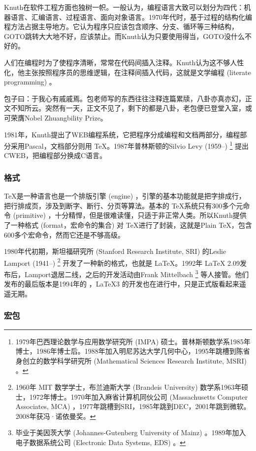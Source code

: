Knuth在软件工程方面也独树一帜。一般认为，编程语言大致可以划分为四代：机器语言、汇编语言、过程语言、面向对象语言。1970年代时，基于过程的结构化编程方法占据主导地方。它认为程序只应该包含顺序、分支、循环等三种结构，GOTO跳转大大地不好，应该禁止。而Knuth认为只要使用得当，GOTO没什么不好的。

人们在编程时为了使程序清晰，常常在代码间插入注释。Knuth认为这不够人性化，他主张按照程序员的思维逻辑，在注释间插入代码，这就是文学编程 (literate programming) 。

包子曰：于我心有戚戚焉。包老师写的东西往往注释连篇累牍，八卦亦真亦幻，正文不知所云。突然有一天，正文不见了，剩下的都是八卦，老包便已登堂入室，或可荣膺Nobel Zhuangbility Prize。

1981年，Knuth提出了WEB编程系统，它把程序分成编程和文档两部分，编程部分采用Pascal，文档部分则用 \TeX。1987年普林斯顿的Silvio Levy (1959--)\indexLevy{}  \footnote{1979年巴西理论数学与应用数学研究所 (IMPA) 硕士。普林斯顿数学系1985年博士，1986年博士后。1988年加入明尼苏达大学几何中心，1995年跳槽到陈省身创立的数学科学研究所 (Mathematical Sciences Research Institute, MSRI) 。} 提出CWEB，把编程部分换成C语言。

\subsubsection{格式}

\TeX 是一种语言也是一个排版引擎 (engine) ，引擎的基本功能就是把字排成行，把行排成页，涉及到断字、断行、分页等算法。基本的 \TeX 系统只有300多个元命令 (primitive) ，十分精悍，但是很难读懂，只适于非正常人类。所以Knuth提供了一种格式 (format，宏命令的集合) 对 \TeX 进行了封装，这就是Plain \TeX ，包含600多个宏命令，然而它还是不够高级。

1980年代初期，斯坦福研究所 (Stanford Research Institute, SRI) 的Leslie Lamport (1941--)\indexLamport{} \footnote{1960年 MIT 数学学士，布兰迪斯大学 (Brandeis University) 数学系1963年硕士，1972年博士。1970年加入麻省计算机同伙公司 (Massachusetts Computer Associates, MCA) ，1977年跳槽到SRI，1985年跳到DEC，2001年跳到微软。2008年获冯·诺依曼奖。} 开发了一种新的格式，也就是 \LaTeX。1992年 \LaTeX{} 2.09发布后，Lamport退居二线，之后的开发活动由Frank Mittelbach\indexMittelbach{} \footnote{毕业于美因茨大学 (Johannes-Gutenberg University of Mainz) 。1989年加入电子数据系统公司 (Electronic Data Systems, EDS) 。} 等人接管。他们发布的最后版本是1994年的 \LaTeXe，\LaTeX 3 的开发也在进行中，只是正式版看起来遥遥无期。

\subsubsection{宏包}

